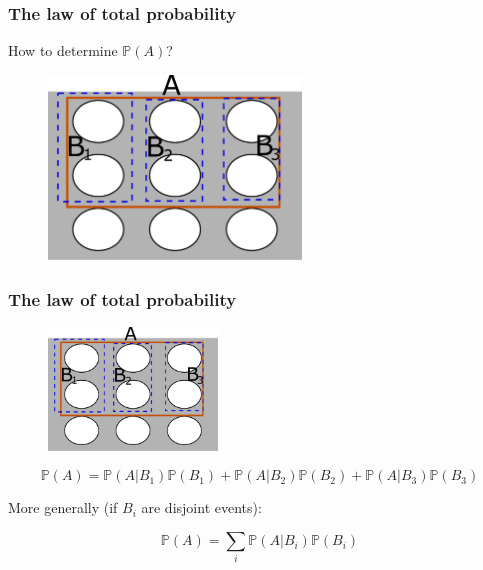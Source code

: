 \documentclass{beamer}
\begin{document}
	\begin{frame}
		\frametitle{The law of total probability}
		
		How to determine $\mathbb{P}(A)$?
		
		\begin{figure}[ht]
			\centerline{\includegraphics[width=0.6\textwidth]{./figures/pebble_world_prob_total.pdf}}
		\end{figure}
		
	\end{frame}

	\begin{frame}
		\frametitle{The law of total probability}
		
		\begin{figure}[ht]
			\centerline{\includegraphics[width=0.4\textwidth]{./figures/pebble_world_prob_total.pdf}}
		\end{figure}
		
		\begin{equation}
			\mathbb{P}(A) =  \mathbb{P}(A|B_1)\mathbb{P}(B_1) + \mathbb{P}(A|B_2)\mathbb{P}(B_2) + \mathbb{P}(A|B_3)\mathbb{P}(B_3)
		\end{equation}
	
	More generally (if $B_i$ are disjoint events):
	
	\begin{equation}
		\mathbb{P}(A) =  \sum_{i} \mathbb{P}(A|B_i)\mathbb{P}(B_i)
	\end{equation}
	
	\end{frame}
\end{document}
